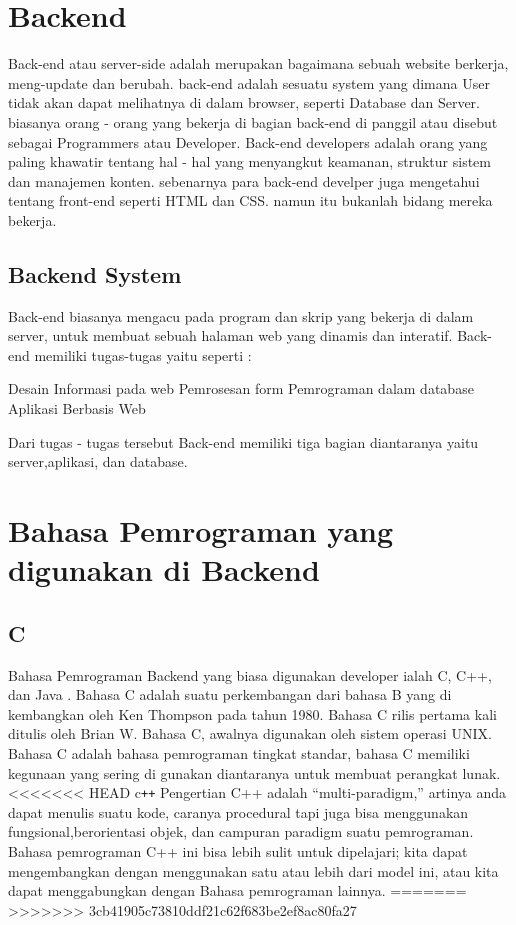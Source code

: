 \section{Backend}
Back-end atau server-side adalah merupakan bagaimana sebuah website berkerja, meng-update
dan berubah. back-end adalah sesuatu system yang dimana User tidak akan dapat melihatnya di dalam browser,
seperti Database dan Server. biasanya orang - orang yang bekerja di bagian back-end di panggil atau disebut sebagai
Programmers atau Developer. Back-end developers adalah orang yang paling khawatir tentang hal - hal yang menyangkut keamanan,
struktur sistem dan manajemen konten. sebenarnya para back-end develper juga mengetahui tentang front-end seperti HTML dan CSS.
namun itu bukanlah bidang mereka bekerja. 

\subsection{Backend System}
Back-end biasanya mengacu pada program dan skrip yang bekerja di dalam server, untuk membuat sebuah halaman web yang dinamis dan interatif. Back-end memiliki tugas-tugas yaitu seperti :

Desain Informasi pada web
Pemrosesan form
Pemrograman dalam database
Aplikasi Berbasis Web

Dari tugas - tugas tersebut Back-end memiliki tiga bagian diantaranya yaitu server,aplikasi, dan database.

\section{Bahasa Pemrograman yang digunakan di Backend}

\subsection{C}
Bahasa Pemrograman Backend yang biasa digunakan developer ialah C, C++, dan Java .
Bahasa C adalah suatu perkembangan dari bahasa B yang di kembangkan oleh Ken Thompson pada tahun 1980.
Bahasa C rilis pertama kali ditulis oleh Brian W. Bahasa C, awalnya digunakan oleh sistem operasi UNIX.
Bahasa C adalah bahasa pemrograman tingkat standar, bahasa C memiliki kegunaan yang sering di gunakan
diantaranya untuk membuat perangkat lunak.
<<<<<<< HEAD
c\verb|++|
Pengertian C++ adalah “multi-paradigm,” artinya anda dapat menulis suatu kode, caranya procedural tapi juga bisa menggunakan fungsional,berorientasi objek, dan campuran paradigm suatu pemrograman.  Bahasa pemrograman C++ ini bisa lebih sulit untuk dipelajari; kita dapat mengembangkan dengan menggunakan satu atau lebih dari model ini,  atau kita dapat menggabungkan dengan Bahasa pemrograman lainnya.
=======
>>>>>>> 3cb41905c73810ddf21c62f683be2ef8ac80fa27

